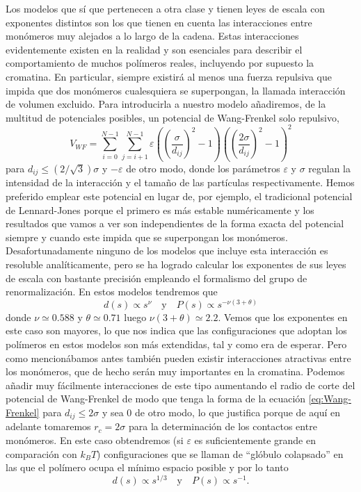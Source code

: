 Los modelos que sí que pertenecen a otra clase y tienen leyes de escala con exponentes distintos son los que tienen en cuenta las interacciones entre monómeros muy alejados a lo largo de la cadena. Estas interacciones evidentemente existen en la realidad y son esenciales para describir el comportamiento de muchos polímeros reales, incluyendo por supuesto la cromatina. En particular, siempre existirá al menos una fuerza repulsiva que impida que dos monómeros cualesquiera se superpongan, la llamada interacción de volumen excluido. Para introducirla a nuestro modelo añadiremos, de la multitud de potenciales posibles, un potencial de Wang-Frenkel \cite{Wang2020} solo repulsivo,
\begin{equation}
    \label{eq:Wang-Frenkel}
    V_{WF}=\sum_{i=0}^{N-1}\sum_{j=i+1}^{N-1}\varepsilon\left(\left(\frac{\sigma}{d_{ij}}\right)^{2}-1\right)\left(\left(\frac{2\sigma}{d_{ij}}\right)^{2}-1\right)^{2}
\end{equation}
para $d_{ij}\leq\left(2/\sqrt{3}\right)\sigma$ y $-\varepsilon$ de otro modo, donde los parámetros $\varepsilon$ y $\sigma$ regulan la intensidad de la interacción y el tamaño de las partículas respectivamente. Hemos preferido emplear este potencial en lugar de, por ejemplo, el tradicional potencial de Lennard-Jones porque el primero es más estable numéricamente y los resultados que vamos a ver son independientes de la forma exacta del potencial siempre y cuando este impida que se superpongan los monómeros. Desafortunadamente ninguno de los modelos que incluye esta interacción es resoluble analíticamente, pero se ha logrado calcular los exponentes de sus leyes de escala con bastante precisión empleando el formalismo del grupo de renormalización. En estos modelos tendremos que \cite{desCloizeaux1980}
\begin{equation}
    \label{eq:excluded_volume_sd_cp}
    d(s)\propto s^{\nu}  \quad \text{y} \quad P(s)\propto s^{-\nu(3+\theta)}
\end{equation}
donde $\nu\simeq0.588$ y $\theta\simeq0.71$ luego $\nu(3+\theta)\simeq2.2$. Vemos que los exponentes en este caso son mayores, lo que nos indica que las configuraciones que adoptan los polímeros en estos modelos son más extendidas, tal y como era de esperar. Pero como mencionábamos antes también pueden existir interacciones atractivas entre los monómeros, que de hecho serán muy importantes en la cromatina. Podemos añadir muy fácilmente interacciones de este tipo aumentando el radio de corte del potencial de Wang-Frenkel de modo que tenga la forma de la ecuación \ref{eq:Wang-Frenkel} para $d_{ij}\leq2\sigma$ y sea $0$ de otro modo, lo que justifica porque de aquí en adelante tomaremos $r_c=2\sigma$ para la determinación de los contactos entre monómeros. En este caso obtendremos (si $\varepsilon$ es suficientemente grande en comparación con $k_BT$) configuraciones que se llaman de ``glóbulo colapsado'' en las que el polímero ocupa el mínimo espacio posible y por lo tanto
\begin{equation}
    \label{eq:collapsed_globule_sd_cp}
    d(s)\propto s^{1/3}  \quad \text{y} \quad P(s)\propto s^{-1}.
\end{equation}
